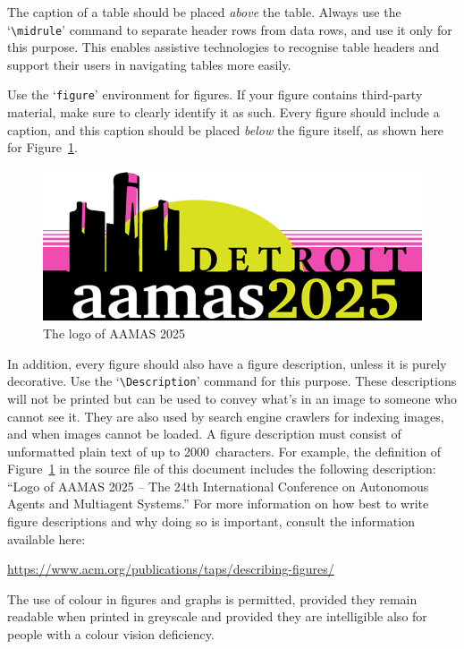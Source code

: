 \documentclass[sigconf,anonymous]{aamas}
\begin{document}
The caption of a table should be placed \emph{above} the table.
Always use the `\verb|\midrule|' command to separate header rows from
data rows, and use it only for this purpose. This enables assistive
technologies to recognise table headers and support their users in
navigating tables more easily.

\balance

Use the `\texttt{figure}' environment for figures. If your figure
contains third-party material, make sure to clearly identify it as such.
Every figure should include a caption, and this caption should be placed
\emph{below} the figure itself, as shown here for Figure~\ref{fig:logo}.

\begin{figure}[h]
  \centering
  \includegraphics[width=0.75\linewidth]{aamas2025logo}
  \caption{The logo of AAMAS 2025}
  \label{fig:logo}
\end{figure}

In addition, every figure should also have a figure description, unless
it is purely decorative. Use the `\verb|\Description|' command for this
purpose. These descriptions will not be printed but can be used to
convey what's in an image to someone who cannot see it. They are also
used by search engine crawlers for indexing images, and when images
cannot be loaded. A figure description must consist of unformatted plain
text of up to 2000~characters. For example, the definition of
Figure~\ref{fig:logo} in the source file of this document includes the
following description: ``Logo of AAMAS 2025 -- The 24th International Conference on Autonomous Agents and Multiagent Systems.'' For more information on how best to write figure descriptions
and why doing so is important, consult the information available here:
%
\begin{center}
  \url{https://www.acm.org/publications/taps/describing-figures/}
\end{center}
%
The use of colour in figures and graphs is permitted, provided they
remain readable when printed in greyscale and provided they are
intelligible also for people with a colour vision deficiency.
\end{document}
